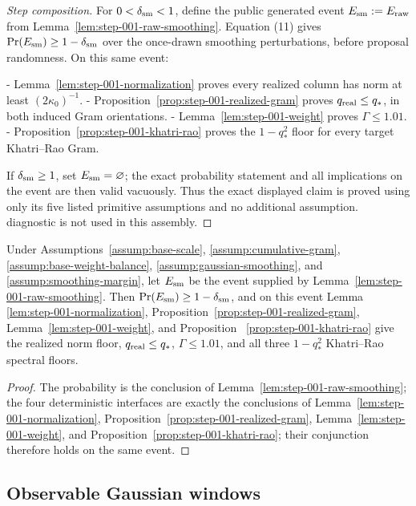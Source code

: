\begin{proof}[Step composition]
For $0<\delta_{\rm sm}<1$, define the public generated event
$E_{\rm sm}:=E_{\rm raw}$ from
Lemma~\ref{lem:step-001-raw-smoothing}. Equation (11) gives
$\Pr(E_{\rm sm})\ge1-\delta_{\rm sm}$ over the once-drawn smoothing
perturbations, before proposal randomness. On this same event:

- Lemma~\ref{lem:step-001-normalization} proves every realized column
  has norm at least $(2\kappa _0)^{-1}$.
- Proposition~\ref{prop:step-001-realized-gram} proves
  $q_{\rm real}\le q_*$, in both induced Gram orientations.
- Lemma~\ref{lem:step-001-weight} proves $\Gamma\le1.01$.
- Proposition~\ref{prop:step-001-khatri-rao} proves the
  $1-q_*^2$ floor for every target Khatri--Rao Gram.

If $\delta_{\rm sm}\ge1$, set $E_{\rm sm}=\varnothing$; the exact
probability statement and all implications on the event are then valid
vacuously. Thus the exact displayed claim is proved using only its five
listed primitive assumptions and no additional assumption. diagnostic is not used in this assembly.
\end{proof}

\begin{proposition}\label{prop:step-001-geometry}
Under Assumptions~\ref{assump:base-scale},
\ref{assump:cumulative-gram}, \ref{assump:base-weight-balance},
\ref{assump:gaussian-smoothing}, and
\ref{assump:smoothing-margin}, let $E_{\rm sm}$ be the event supplied by
Lemma~\ref{lem:step-001-raw-smoothing}.  Then
$\Pr(E_{\rm sm})\ge1-\delta_{\rm sm}$, and on this event Lemma~
\ref{lem:step-001-normalization}, Proposition~\ref{prop:step-001-realized-gram},
Lemma~\ref{lem:step-001-weight}, and Proposition~
\ref{prop:step-001-khatri-rao} give the realized norm floor,
$q_{\rm real}\le q_*$, $\Gamma\le1.01$, and all three
$1-q_*^2$ Khatri--Rao spectral floors.
\begin{proof}
The probability is the conclusion of Lemma~\ref{lem:step-001-raw-smoothing};
 the four deterministic interfaces are exactly the conclusions of
 Lemma~\ref{lem:step-001-normalization}, Proposition~\ref{prop:step-001-realized-gram},
 Lemma~\ref{lem:step-001-weight}, and Proposition~\ref{prop:step-001-khatri-rao};
 their conjunction therefore holds on the same event.
\end{proof}
\end{proposition}


\subsection{Observable Gaussian windows}\label{app:step-002}

